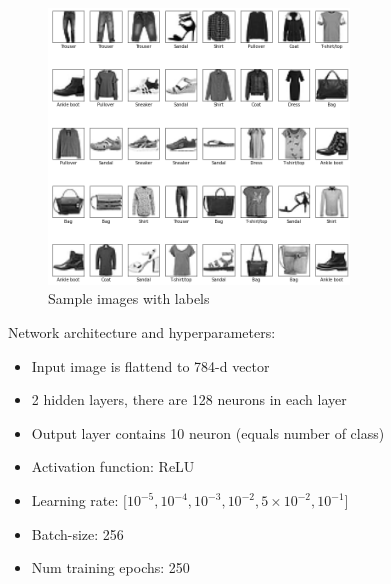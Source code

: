 \documentclass[14pt, a4paper]{article}
\numberwithin{equation}{section}
\numberwithin{algorithm}{section}
\numberwithin{figure}{section}
\begin{document}
\begin{figure}[h!]
  \centering
  \includegraphics[width=8cm]{sample_images_with_labels.png}
  \caption{Sample images with labels}
\end{figure}

Network architecture and hyperparameters:
\begin{itemize}
	  \item Input image is flattend to 784-d vector
		\item 2 hidden layers, there are 128 neurons in each layer
  	\item Output layer contains 10 neuron (equals number of class)
   	\item Activation function: ReLU
    \item Learning rate: $\lbrack 10^{-5}, 10^{-4}, 10^{-3}, 10^{-2}, 5\times10^{-2}, 10^{-1} \rbrack$
    \item Batch-size: 256
    \item Num training epochs: 250
\end{itemize}
\end{document}
